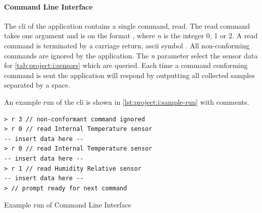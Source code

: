 \paragraph{Command Line Interface}
The \gls{cli} of the {\tracker} application contains a single command, read.
The read command takes one argument and is on the format , where \emph{n} is the integer 0, 1 or 2.
A read command is terminated by a carriage return, ascii symbol \code{\\n}.
All non-conforming commands are ignored by the application.
The \emph{n} parameter select the sensor data for \autoref{tab:project:i:sensors} which are queried.
Each time a command conforming command is sent the application will respond by outputting all collected samples separated by a space.

An example run of the \gls{cli} is shown in \autoref{lst:project:i:sample-run} with comments.

\begin{listing}[H]
  \begin{verbatim}
> r 3 // non-conformant command ignored
> r 0 // read Internal Temperature sensor
-- insert data here --
> r 0 // read Internal Temperature sensor
-- insert data here --
> r 1 // read Humidity Relative sensor
-- insert data here --
> // prompt ready for next command
  \end{verbatim}
  \caption{Example run of Command Line Interface}
  \label{lst:project:i:sample-run}
\end{listing}

